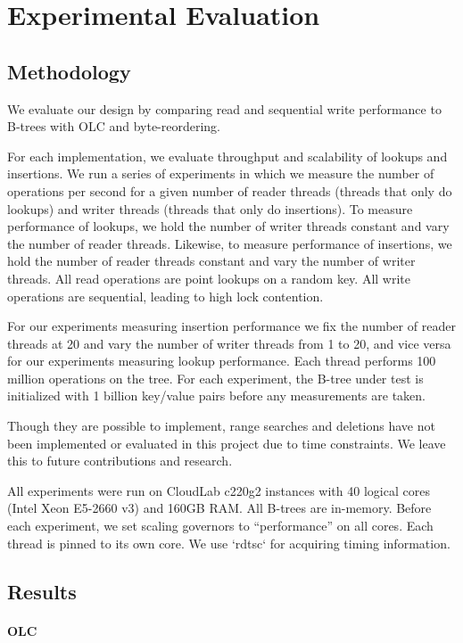 \documentclass[twocolumn]{article}
\begin{document}
\section{Experimental Evaluation}

\subsection{Methodology}

We evaluate our design by comparing read and sequential write performance to
B-trees with OLC and byte-reordering.

For each implementation, we evaluate throughput and scalability of lookups and
insertions. We run a series of experiments in which we measure the number of
operations per second for a given number of reader threads (threads that only
do lookups) and writer threads (threads that only do insertions). To measure
performance of lookups, we hold the number of writer threads constant and vary
the number of reader threads. Likewise, to measure performance of insertions,
we hold the number of reader threads constant and vary the number of writer
threads. All read operations are point lookups on a random key. All write
operations are sequential, leading to high lock contention.

For our experiments measuring insertion performance we fix the number of reader
threads at 20 and vary the number of writer threads from 1 to 20, and vice
versa for our experiments measuring lookup performance. Each thread performs
100 million operations on the tree. For each experiment, the B-tree under test
is initialized with 1 billion key/value pairs before any measurements are
taken.

Though they are possible to implement, range searches and deletions have not
been implemented or evaluated in this project due to time constraints. We leave
this to future contributions and research.

All experiments were run on CloudLab c220g2 instances with 40 logical cores
(Intel Xeon E5-2660 v3) and 160GB RAM. All B-trees are in-memory. Before each
experiment, we set scaling governors to “performance” on all cores. Each thread
is pinned to its own core. We use `rdtsc` for acquiring timing information.

\subsection{Results}

\paragraph{OLC}
\end{document}
